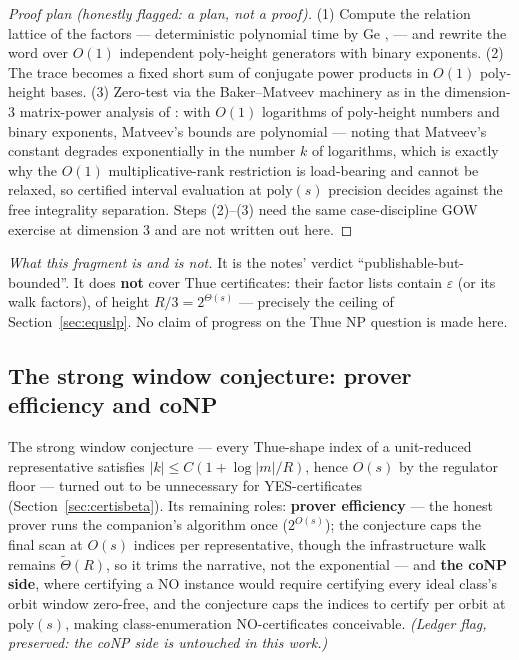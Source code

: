 \documentclass[11pt]{amsart}
\theoremstyle{plain}
\theoremstyle{remark}
\begin{document}
\begin{proof}[Proof plan (honestly flagged: a plan, not a proof)]
(1) Compute the relation lattice of the factors --- deterministic
polynomial time by Ge \cite{Ge93}, \cite[Thm.~165]{vG25} --- and
rewrite the word over $O(1)$ independent poly-height generators with
binary exponents. (2) The trace becomes a fixed short sum of
conjugate power products in $O(1)$ poly-height bases. (3) Zero-test
via the Baker--Matveev machinery as in the dimension-3 matrix-power
analysis of \cite{GOW15}: with $O(1)$ logarithms of poly-height
numbers and binary exponents, Matveev's bounds \cite{Mat00} are
polynomial --- noting that Matveev's constant degrades exponentially
in the number $k$ of logarithms, which is exactly why the $O(1)$
multiplicative-rank restriction is load-bearing and cannot be
relaxed, so certified interval evaluation at $\mathrm{poly}(s)$
precision decides against the free integrality separation. Steps
(2)--(3) need the same case-discipline GOW exercise at dimension 3
and are not written out here.
\end{proof}

\emph{What this fragment is and is not.} It is the notes' verdict
``publishable-but-bounded''. It does \textbf{not} cover Thue
certificates: their factor lists contain $\varepsilon$ (or its walk
factors), of height $R/3 = 2^{\Theta(s)}$ --- precisely the ceiling
of Section~\ref{sec:equslp}. No claim of progress on the Thue NP
question is made here.

\subsection{The strong window conjecture: prover efficiency and coNP}
\label{sec:windowconj}

The strong window conjecture \cite[Remark~7.4]{companion} --- every
Thue-shape index of a unit-reduced representative satisfies
$|k| \le C(1 + \log|m|/R)$, hence $O(s)$ by the regulator floor
\cite{ADF16} --- turned out to be unnecessary for YES-certificates
(Section~\ref{sec:certisbeta}). Its remaining roles: \textbf{prover
efficiency} --- the honest prover runs the companion's algorithm once
($2^{O(s)}$); the conjecture caps the final scan at $O(s)$ indices
per representative, though the infrastructure walk remains
$\widetilde{\Theta}(R)$, so it trims the narrative, not the
exponential --- and \textbf{the coNP side}, where certifying a NO
instance would require certifying every ideal class's orbit window
zero-free, and the conjecture caps the indices to certify per orbit
at $\mathrm{poly}(s)$, making class-enumeration NO-certificates
conceivable. \emph{(Ledger flag, preserved: the coNP side is
untouched in this work.)}
\end{document}
